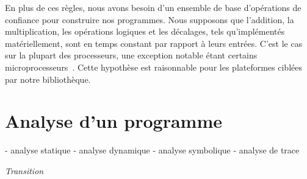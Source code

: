 En plus de ces règles, nous avons besoin d'un ensemble de base d'opérations de confiance pour construire nos programmes. Nous supposons que l'addition, la multiplication, les opérations logiques et les décalages, tels qu'implémentés matériellement, sont en temps constant par rapport à leurs entrées. C'est le cas sur la plupart des processeurs, une exception notable étant certains microprocesseurs~\cite{Por}. Cette hypothèse est raisonnable pour les plateformes ciblées par notre bibliothèque.

\cite{binsecRel2019}


\section{Analyse d'un programme}


 - analyse statique
 - analyse dynamique
 - analyse symbolique
 - analyse de trace



\raggedbottom
\textit{Transition}


